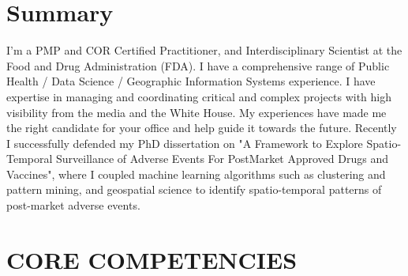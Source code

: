 \documentclass[letterpaper]{twentysecondcv} %
\begin{document}
\makeprofile %


\section{Summary}
I’m a PMP and COR Certified Practitioner, and Interdisciplinary Scientist at the Food and Drug Administration (FDA). I have a comprehensive range of Public Health / Data Science / Geographic Information Systems experience. I have expertise in managing and coordinating critical and complex projects with high visibility from the media and the White House. My experiences have made me the right candidate for your office and help guide it towards the future. Recently I successfully defended my PhD dissertation on "A Framework to Explore Spatio-Temporal Surveillance of Adverse Events For PostMarket Approved Drugs and Vaccines", where I coupled machine learning algorithms such as clustering and pattern mining, and geospatial science to identify spatio-temporal patterns of post-market adverse events. %

\section{CORE COMPETENCIES}
\end{document}
